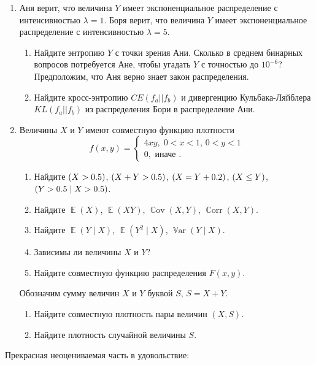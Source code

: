 \documentclass[12pt]{article}
\DeclareMathOperator{\Cov}{\mathbb{C}ov}
\DeclareMathOperator{\Corr}{\mathbb{C}orr}
\DeclareMathOperator{\Var}{\mathbb{V}ar}
\let\P\relax
\DeclareMathOperator{\P}{\mathbb{P}}
\DeclareMathOperator{\E}{\mathbb{E}}
\begin{document}
\begin{enumerate}
\item Аня верит, что величина $Y$ имеет экспоненциальное распределение с интенсивностью $\lambda = 1$.
Боря верит, что величина $Y$ имеет экспоненциальное распределение с интенсивностью $\lambda = 5$.

\begin{enumerate}
  \item Найдите энтропию $Y$ с точки зрения Ани. Сколько в среднем бинарных вопросов потребуется Ане, чтобы угадать $Y$ с точностью до $10^{-6}$?
  Предположим, что Аня верно знает закон распределения. 
  \item Найдите кросс-энтропию $CE(f_a || f_b)$ и дивергенцию Кульбака-Ляйблера $KL(f_a || f_b)$ из распределения Бори в распределение Ани. 
\end{enumerate}


\item Величины $X$ и $Y$ имеют совместную функцию плотности
\[
f(x,y)=\begin{cases}
4xy, \; 0<x<1, \, 0<y<1\\
0, \text{ иначе }.
\end{cases}
\]

\begin{enumerate}
\item Найдите $\P(X>0.5)$, $\P(X+Y>0.5)$, $\P(X=Y+0.2)$, $\P(X\leq Y)$, $\P(Y>0.5 \mid X>0.5)$.
\item Найдите $\E(X)$, $\E(XY)$, $\Cov(X,Y)$, $\Corr(X,Y)$.
\item Найдите $\E(Y \mid X)$, $\E(Y^2 \mid X)$, $\Var(Y \mid X)$.
\item Зависимы ли величины $X$ и $Y$?
\item Найдите совместную функцию распределения $F(x, y)$.
\end{enumerate}

Обозначим сумму величин $X$ и $Y$ буквой $S$, $S = X+Y$.

\begin{enumerate}[resume]
\item Найдите совместную плотность пары величин $(X, S)$.
\item Найдите плотность случайной величины $S$.
\end{enumerate}

\end{enumerate}


Прекрасная неоцениваемая часть в удовольствие:
\end{document}
